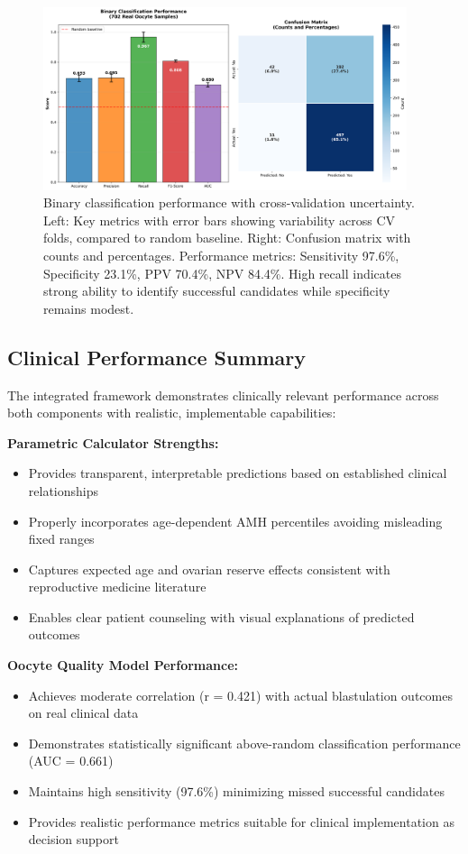 \begin{figure}[H]
    \centering
    \includegraphics[width=0.95\textwidth]{figures/oocyte_classification_metrics.png}
    \caption{Binary classification performance with cross-validation uncertainty. Left: Key metrics with error bars showing variability across CV folds, compared to random baseline. Right: Confusion matrix with counts and percentages. Performance metrics: Sensitivity 97.6\%, Specificity 23.1\%, PPV 70.4\%, NPV 84.4\%. High recall indicates strong ability to identify successful candidates while specificity remains modest.}
    \label{fig:oocyte_metrics}
\end{figure}

\subsection{Clinical Performance Summary}

The integrated framework demonstrates clinically relevant performance across both components with realistic, implementable capabilities:

\textbf{Parametric Calculator Strengths:}
\begin{itemize}
\item Provides transparent, interpretable predictions based on established clinical relationships
\item Properly incorporates age-dependent AMH percentiles avoiding misleading fixed ranges
\item Captures expected age and ovarian reserve effects consistent with reproductive medicine literature
\item Enables clear patient counseling with visual explanations of predicted outcomes
\end{itemize}

\textbf{Oocyte Quality Model Performance:}
\begin{itemize}
\item Achieves moderate correlation (r = 0.421) with actual blastulation outcomes on real clinical data
\item Demonstrates statistically significant above-random classification performance (AUC = 0.661)
\item Maintains high sensitivity (97.6\%) minimizing missed successful candidates
\item Provides realistic performance metrics suitable for clinical implementation as decision support
\end{itemize}

